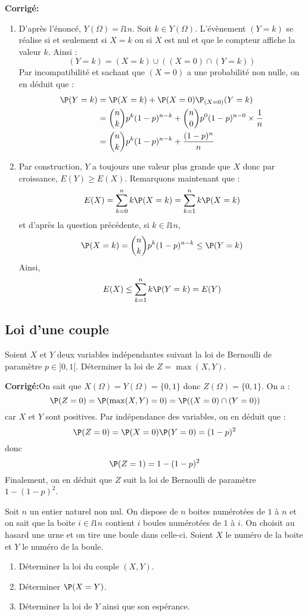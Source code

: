 \documentclass[a4paper,twoside,french,11pt]{VcCours}
\newcommand{\corr}{\textbf{Corrigé:}}
\begin{document}
\corr 

\begin{enumerate}
\item D'après l'énoncé, $Y(\Omega) = \ii{1}{n}$. Soit $k \in Y(\Omega)$. L'évènement $(Y=k)$ se réalise si et seulement si $X=k$ ou si $X$ est nul et que le compteur affiche la valeur $k$. Ainsi :
$$ (Y=k) = (X=k) \cup ((X=0) \cap (Y=k))$$
Par incompatibilité et sachant que $(X=0)$ a une probabilité non nulle, on en déduit que :
\begin{align*}
 \P(Y=k) & = \P(X=k) + \P(X=0) \P_{(X=0)}(Y=k) \\
 & = \binom{n}{k} p^k (1-p)^{n-k} + \binom{n}{0} p^0 (1-p)^{n-0} \times \dfrac{1}{n} \\
 & = \binom{n}{k} p^k (1-p)^{n-k} + \dfrac{(1-p)^n}{n}
 \end{align*}
 \item Par construction, $Y$ a toujours une valeur plus grande que $X$ donc par croissance, $E(Y) \geq E(X)$. Remarquons maintenant que :
 $$ E(X) = \sum_{k=0}^n k \P(X=k) =  \sum_{k=1}^n k \P(X=k)$$
 et d'après la question précédente, si $k \in \ii{1}{n}$,
 $$ \P(X=k) = \binom{n}{k} p^k (1-p)^{n-k}  \leq \P(Y=k)$$
 Ainsi,
 $$ E(X) \leq \sum_{k=1}^n k \P(Y=k) = E(Y)$$
\end{enumerate}


\subsection{Loi d'une couple}


\begin{Exercice}{} Soient $X$ et $Y$ deux variables indépendantes suivant la loi de Bernoulli de paramètre $p \in ]0,1[$. Déterminer la loi de $Z= \max(X,Y)$.
\end{Exercice}

\corr On sait que $X(\Omega) = Y(\Omega) = \lbrace 0,1 \rbrace$ donc $Z(\Omega) = \lbrace 0,1 \rbrace$. On a :
$$ \P(Z=0) = \P(\max(X,Y)=0) = \P((X=0) \cap (Y=0))$$
car $X$ et $Y$ sont positives. Par indépendance des variables, on en déduit que :
$$ \P(Z=0) = \P(X=0) \P(Y=0) = (1-p)^2$$
donc 
$$ \P(Z=1) = 1- (1-p)^2$$
Finalement, on en déduit que $Z$ suit la loi de Bernoulli de paramètre $1-(1-p)^2$.

\begin{Exercice}{} Soit $n$ un entier naturel non nul. On dispose de $n$ boites numérotées de $1$ à $n$ et on sait que la boite $i \in \ii{1}{n}$ contient $i$ boules numérotées de $1$ à $i$. On choisit au hasard une urne et on tire une boule dans celle-ci. Soient $X$ le numéro de la boite et $Y$ le numéro de la boule. 

\begin{enumerate}
\item Déterminer la loi du couple $(X,Y)$.
\item Déterminer $\P(X=Y)$.
\item Déterminer la loi de $Y$ ainsi que son espérance.
\end{enumerate}
\end{Exercice}
\end{document}
